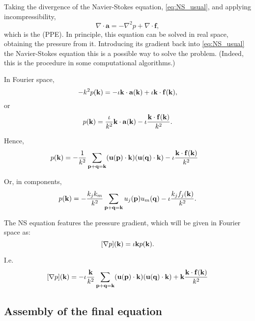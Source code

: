 Taking the divergence of the Navier-Stokes equation, \eqref{eq:NS_usual}, and applying incompressibility,
\begin{equation}\label{eq:Poisson}
	\nabla\cdot \mathbf{a} = -\nabla^2 p + \nabla\cdot \mathbf{f} ,
\end{equation}
which is the  (PPE).
In principle, this equation can be solved in real space, obtaining the pressure from it. Introducing its gradient back into \eqref{eq:NS_usual} the Navier-Stokes equation this is a possible way to solve the problem. (Indeed, this is the procedure in some computational algorithms.)

In Fourier space,
\[
-k^2 p (\mathbf{k} ) = - \iota \mathbf{k} \cdot \mathbf{a}(\mathbf{k}) + \iota \mathbf{k} \cdot \mathbf{f}(\mathbf{k}) ,
\]
or
\[
p (\mathbf{k} ) =  \frac{\iota}{k^2} \mathbf{k} \cdot \mathbf{a}(\mathbf{k})
- \iota \frac{\mathbf{k} \cdot \mathbf{f}(\mathbf{k})}{k^2}  .
\]


Hence,
\begin{align*}
	p (\mathbf{k} ) & = -\frac{1}{k^2} 
	\sum_{ \mathbf{p} + \mathbf{q} = \mathbf{k}}
	(\mathbf{u}(\mathbf{p} )
	\cdot
	\mathbf{k}
	)
	(
	\mathbf{u}(\mathbf{q} ) \cdot
	\mathbf{k}
	) 
	- \iota
	\frac{\mathbf{k} \cdot \mathbf{f}(\mathbf{k}) }{k^2}     
\end{align*}


Or, in components,
\[
p (\mathbf{k} ) = -\frac{k_j k_m}{k^2}
\sum_{ \mathbf{p} + \mathbf{q} = \mathbf{k}}
u_j(\mathbf{p} )
u_m(\mathbf{q} )
- \iota
\frac{k_j f_j(\mathbf{k}) }{k^2} .
\]


The NS equation features the pressure gradient, which will be given in Fourier space as:
\[
[\nabla p ](\mathbf{k}) = \iota \mathbf{k} p(\mathbf{k}) .
\]

I.e.
\[[\nabla p ](\mathbf{k}) =
-\iota \frac{\mathbf{k} }{k^2} 
\sum_{ \mathbf{p} + \mathbf{q} = \mathbf{k}}
(\mathbf{u}(\mathbf{p} )
\cdot
\mathbf{k}
)
(
\mathbf{u}(\mathbf{q} ) \cdot
\mathbf{k}
) 
+ \mathbf{k}
\frac{\mathbf{k} \cdot \mathbf{f}(\mathbf{k})  }{k^2} 
\]




\subsection{Assembly of the final equation}


